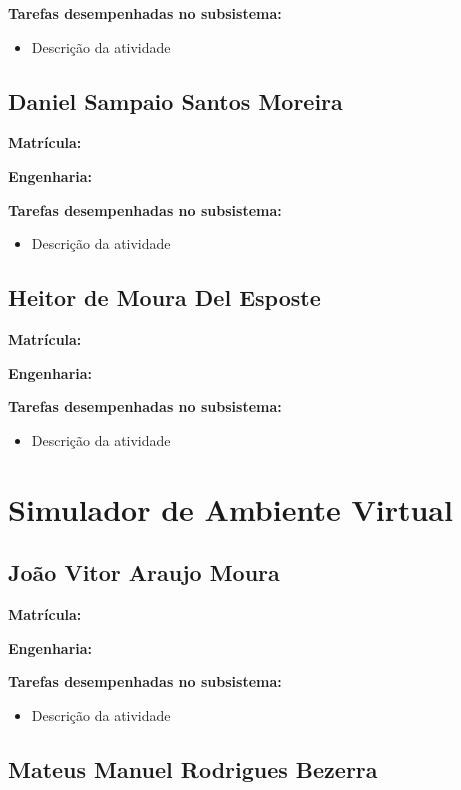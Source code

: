 \textbf{Tarefas desempenhadas no subsistema:}

\begin{itemize}
\item Descrição da atividade
\end{itemize}


\subsection{Daniel Sampaio Santos Moreira}

\textbf{Matrícula:}

\textbf{Engenharia:}

\textbf{Tarefas desempenhadas no subsistema:}

\begin{itemize}
\item Descrição da atividade
\end{itemize}


\subsection{Heitor de Moura Del Esposte}

\textbf{Matrícula:}

\textbf{Engenharia:}

\textbf{Tarefas desempenhadas no subsistema:}

\begin{itemize}
\item Descrição da atividade
\end{itemize}

\section{Simulador de Ambiente Virtual}

\subsection{João Vitor Araujo Moura}

\textbf{Matrícula:}

\textbf{Engenharia:}

\textbf{Tarefas desempenhadas no subsistema:}

\begin{itemize}
\item Descrição da atividade
\end{itemize}


\subsection{Mateus Manuel Rodrigues Bezerra}

